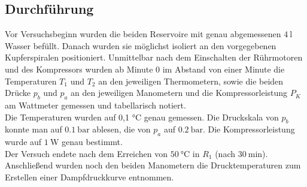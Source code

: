 \subsection{Durchführung}
Vor Versuchsbeginn wurden die beiden Reservoire mit genau abgemessenen $\SI{4}{\litre}$ Wasser befüllt.
Danach wurden sie möglichst isoliert an den vorgegebenen Kupferspiralen positioniert.
Unmittelbar nach dem Einschalten der Rührmotoren und des Kompressors wurden ab Minute 0 im Abstand von einer Minute die Temperaturen $T_1$ und $T_2$ an den jeweiligen Thermometern, sowie die beiden Drücke $ p_b $ und $ p_a $ an den jeweiligen Manometern und die Kompressorleistung $ P_K $ am Wattmeter gemessen und tabellarisch notiert.\\
Die Temperaturen wurden auf 0,1 $ \si{\celsius} $ genau gemessen.
Die Druckskala von $ p_b $ konnte man auf $ \SI{0,1}{\bar} $ ablesen, die von $ p_a $ auf $ \SI{0,2}{\bar} $.
Die Kompressorleistung wurde auf $ \SI{1}{\watt} $ genau bestimmt.\\
Der Versuch endete nach dem Erreichen von $ \SI{50}{\celsius} $ in $ R_1 $ (nach $ \SI{30}{\minute} $).
Anschließend wurden noch den beiden Manometern die Drucktemperaturen zum Erstellen einer Dampfdruckkurve entnommen.
\label{sec:Durchführung}
